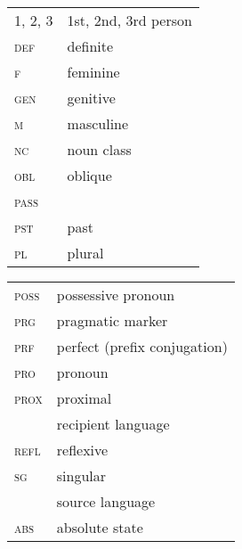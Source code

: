 \documentclass[output=paper]{langsci/langscibook}
\begin{document}
\begin{tabularx}{.5\textwidth}[t]{@{}lQ@{}}
\textsc{1, 2, 3} & 1st, 2nd, 3rd person \\
\textsc{def} & {definite}  \\
\textsc{f} & feminine \\
\textsc{gen} & genitive \\
\textsc{m} & masculine \\
\textsc{nc} & noun class  \\
\textsc{obl} & oblique \\
\textsc{pass} &  \\
\textsc{pst} & past \\
\textsc{pl} & plural \\
\end{tabularx}%
\begin{tabularx}{.5\textwidth}[t]{@{}lQ@{}}
\textsc{poss} & possessive pronoun \\
\textsc{prg} & pragmatic marker \\
\textsc{prf} & perfect (prefix conjugation) \\
\textsc{pro} & pronoun \\
\textsc{prox} & proximal \\
 & {recipient language} \\
\textsc{refl} & reflexive \\
\textsc{sg} & singular \\
 & {source language} \\
\textsc{abs} & absolute state \\
\end{tabularx}%

{\sloppy\printbibliography[heading=subbibliography,notkeyword=this]}
\end{document}
